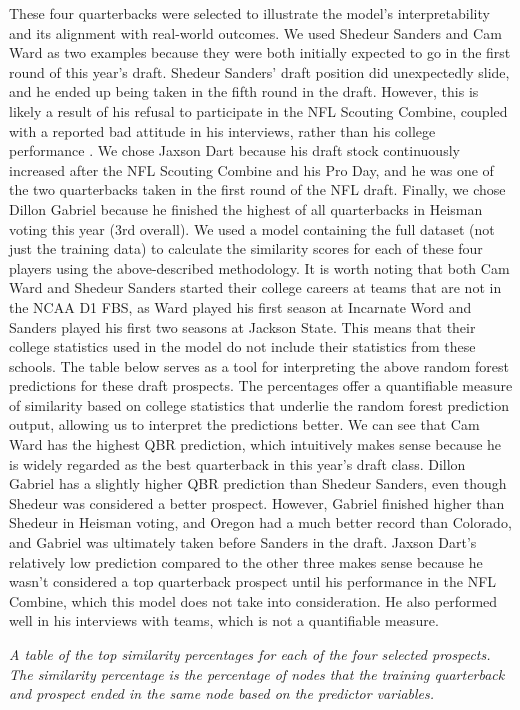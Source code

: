 \documentclass{article}
\begin{document}
These four quarterbacks were selected to illustrate the model’s interpretability and its alignment with real-world outcomes. We used Shedeur Sanders and Cam Ward as two examples because they were both initially expected to go in the first round of this year's draft. Shedeur Sanders' draft position did unexpectedly slide, and he ended up being taken in the fifth round in the draft. However, this is likely a result of his refusal to participate in the NFL Scouting Combine, coupled with a reported bad attitude in his interviews, rather than his college performance \citep{mckenna_what_nodate}. We chose Jaxson Dart because his draft stock continuously increased after the NFL Scouting Combine and his Pro Day, and he was one of the two quarterbacks taken in the first round of the NFL draft. Finally, we chose Dillon Gabriel because he finished the highest of all quarterbacks in Heisman voting this year (3rd overall). We used a model containing the full dataset (not just the training data) to calculate the similarity scores for each of these four players using the above-described methodology. It is worth noting that both Cam Ward and Shedeur Sanders started their college careers at teams that are not in the NCAA D1 FBS, as Ward played his first season at Incarnate Word and Sanders played his first two seasons at Jackson State. This means that their college statistics used in the model do not include their statistics from these schools. The table below serves as a tool for interpreting the above random forest predictions for these draft prospects. The percentages offer a quantifiable measure of similarity based on college statistics that underlie the random forest prediction output, allowing us to interpret the predictions better. We can see that Cam Ward has the highest QBR prediction, which intuitively makes sense because he is widely regarded as the best quarterback in this year's draft class. Dillon Gabriel has a slightly higher QBR prediction than Shedeur Sanders, even though Shedeur was considered a better prospect. However, Gabriel finished higher than Shedeur in Heisman voting, and Oregon had a much better record than Colorado, and Gabriel was ultimately taken before Sanders in the draft. Jaxson Dart's relatively low prediction compared to the other three makes sense because he wasn't considered a top quarterback prospect until his performance in the NFL Combine, which this model does not take into consideration. He also performed well in his interviews with teams, which is not a quantifiable measure.

\begin{table}[H]
\resizebox{\textwidth}{!}{
  }
  \caption{\textit{A table of the top similarity percentages for each of the four selected prospects. The similarity percentage is the percentage of nodes that the training quarterback and prospect ended in the same node based on the predictor variables.}}
\end{table}
\end{document}
